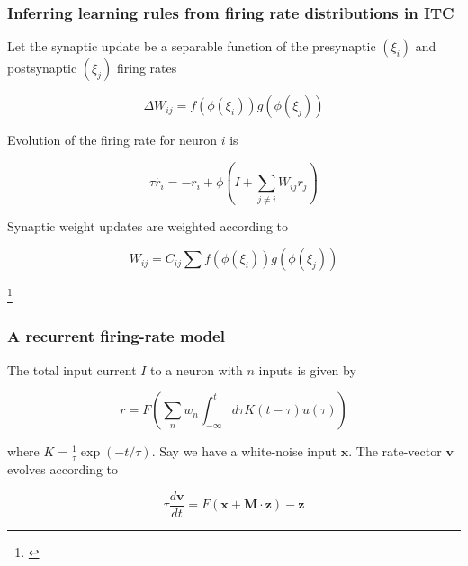 \documentclass{beamer}
\begin{document}
\begin{frame}[plain]
\frametitle{Inferring learning rules from firing rate distributions in ITC}

Let the synaptic update be a separable function of the presynaptic $(\xi_{i})$ and postsynaptic $(\xi_{j})$ firing rates

\begin{equation*}
\Delta W_{ij} = f(\phi(\xi_{i}))g(\phi(\xi_{j}))
\end{equation*}

Evolution of the firing rate for neuron $i$ is

\begin{equation*}
\tau \dot{r_{i}} = -r_{i} + \phi(I + \sum_{j\neq i} W_{ij}r_{j})
\end{equation*}

Synaptic weight updates are weighted according to 

\begin{equation*}
W_{ij} = C_{ij}\sum  f(\phi(\xi_{i}))g(\phi(\xi_{j}))
\end{equation*}




\footnote{\cite{hopfield}}
\end{frame}

\begin{frame}[plain]
\frametitle{A recurrent firing-rate model}

The total input current $I$ to a neuron with $n$ inputs is given by

\begin{equation*}
r = F(\sum_{n} w_{n} \int_{-\infty}^{t}d\tau K(t-\tau)u(\tau))
\end{equation*}

where $K = \frac{1}{\tau}\exp(-t/\tau)$. Say we have a white-noise input $\bm{x}$. The rate-vector $\bm{v}$ evolves according to

\begin{equation*}
\tau \frac{d\bm{v}}{dt} = F(\bm{x} + \bm{M}\cdot \bm{z}) - \bm{z}
\end{equation*}


\end{frame}
\end{document}
